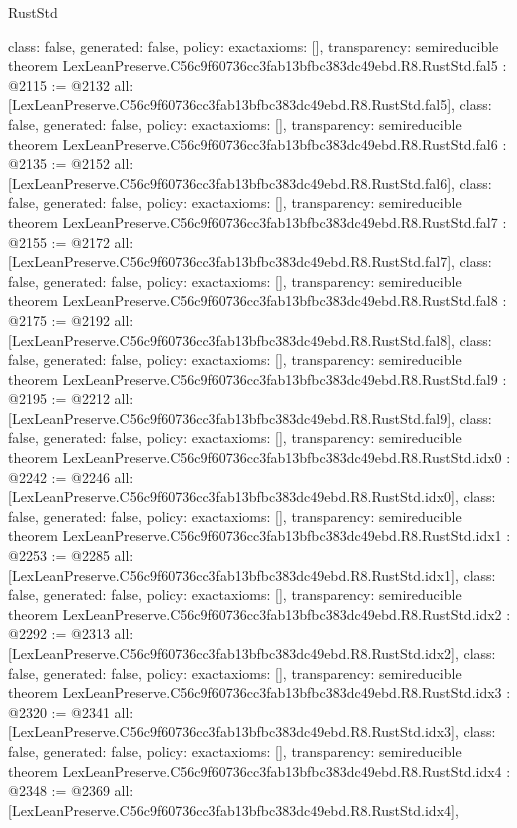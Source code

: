 \begin{lexlean}{RustStd}
\begin{coremodule}
{  class: false,
  generated: false,
  policy: exact{axioms: []},
  transparency: semireducible
}
theorem LexLeanPreserve.C56c9f60736cc3fab13bfbc383dc49ebd.R8.RustStd.fal5 : @2115 := @2132 {
  all: [LexLeanPreserve.C56c9f60736cc3fab13bfbc383dc49ebd.R8.RustStd.fal5],
  class: false,
  generated: false,
  policy: exact{axioms: []},
  transparency: semireducible
}
theorem LexLeanPreserve.C56c9f60736cc3fab13bfbc383dc49ebd.R8.RustStd.fal6 : @2135 := @2152 {
  all: [LexLeanPreserve.C56c9f60736cc3fab13bfbc383dc49ebd.R8.RustStd.fal6],
  class: false,
  generated: false,
  policy: exact{axioms: []},
  transparency: semireducible
}
theorem LexLeanPreserve.C56c9f60736cc3fab13bfbc383dc49ebd.R8.RustStd.fal7 : @2155 := @2172 {
  all: [LexLeanPreserve.C56c9f60736cc3fab13bfbc383dc49ebd.R8.RustStd.fal7],
  class: false,
  generated: false,
  policy: exact{axioms: []},
  transparency: semireducible
}
theorem LexLeanPreserve.C56c9f60736cc3fab13bfbc383dc49ebd.R8.RustStd.fal8 : @2175 := @2192 {
  all: [LexLeanPreserve.C56c9f60736cc3fab13bfbc383dc49ebd.R8.RustStd.fal8],
  class: false,
  generated: false,
  policy: exact{axioms: []},
  transparency: semireducible
}
theorem LexLeanPreserve.C56c9f60736cc3fab13bfbc383dc49ebd.R8.RustStd.fal9 : @2195 := @2212 {
  all: [LexLeanPreserve.C56c9f60736cc3fab13bfbc383dc49ebd.R8.RustStd.fal9],
  class: false,
  generated: false,
  policy: exact{axioms: []},
  transparency: semireducible
}
theorem LexLeanPreserve.C56c9f60736cc3fab13bfbc383dc49ebd.R8.RustStd.idx0 : @2242 := @2246 {
  all: [LexLeanPreserve.C56c9f60736cc3fab13bfbc383dc49ebd.R8.RustStd.idx0],
  class: false,
  generated: false,
  policy: exact{axioms: []},
  transparency: semireducible
}
theorem LexLeanPreserve.C56c9f60736cc3fab13bfbc383dc49ebd.R8.RustStd.idx1 : @2253 := @2285 {
  all: [LexLeanPreserve.C56c9f60736cc3fab13bfbc383dc49ebd.R8.RustStd.idx1],
  class: false,
  generated: false,
  policy: exact{axioms: []},
  transparency: semireducible
}
theorem LexLeanPreserve.C56c9f60736cc3fab13bfbc383dc49ebd.R8.RustStd.idx2 : @2292 := @2313 {
  all: [LexLeanPreserve.C56c9f60736cc3fab13bfbc383dc49ebd.R8.RustStd.idx2],
  class: false,
  generated: false,
  policy: exact{axioms: []},
  transparency: semireducible
}
theorem LexLeanPreserve.C56c9f60736cc3fab13bfbc383dc49ebd.R8.RustStd.idx3 : @2320 := @2341 {
  all: [LexLeanPreserve.C56c9f60736cc3fab13bfbc383dc49ebd.R8.RustStd.idx3],
  class: false,
  generated: false,
  policy: exact{axioms: []},
  transparency: semireducible
}
theorem LexLeanPreserve.C56c9f60736cc3fab13bfbc383dc49ebd.R8.RustStd.idx4 : @2348 := @2369 {
  all: [LexLeanPreserve.C56c9f60736cc3fab13bfbc383dc49ebd.R8.RustStd.idx4],
}
\end{coremodule}
\end{lexlean}
